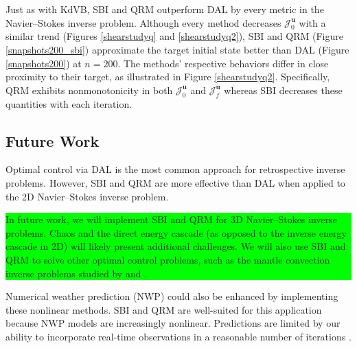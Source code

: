 \documentclass[%
 reprint,
 amsmath,amssymb,
 aps,
 pre,
]{revtex4-2}
\newcommand{\hly}[1]{\colorbox{lime}{\parbox{\columnwidth}{#1}}}
\renewcommand{\vec}[1]{\boldsymbol{#1}}
\newcommand{\Juf}{\mathcal{J}^{u}_f}
\newcommand{\JUo}{\mathcal{J}^{\vec{u}}_0}
\newcommand{\JUf}{\mathcal{J}^{\vec{u}}_f}
\begin{document}
Just as with KdVB, SBI and QRM outperform DAL by every metric in the Navier--Stokes inverse problem.
Although every method decreases $\JUo$ with a similar trend (Figures \ref{shearstudyq} and \ref{shearstudyq2}), SBI and QRM (Figure \ref{snapshots200_sbi}) approximate the target initial state better than DAL (Figure \ref{snapshots200}) at $n=200$.
The methods' respective behaviors differ in close proximity to their target, as illustrated in Figure \ref{shearstudyq2}.
Specifically, QRM exhibits nonmonotonicity in both $\JUo$ and $\JUf$ whereas SBI decreases these quantities with each iteration.



\subsection{Future Work}
\label{secConfuture}
Optimal control via DAL is the most common approach for retrospective inverse problems.
However, SBI and QRM are more effective than DAL when applied to the 2D Navier--Stokes inverse problem.
\hly{In future work, we will implement SBI and QRM for 3D Navier--Stokes inverse problems.
Chaos and the direct energy cascade (as opposed to the inverse energy cascade in 2D) will likely present additional challenges.
We will also use SBI and QRM to solve other optimal control problems, such as the mantle convection inverse problems studied by \cite{Liu2008} and \cite{Li2017}.}
Numerical weather prediction (NWP) could also be enhanced by implementing these nonlinear methods.
SBI and QRM are well-suited for this application because NWP models are increasingly nonlinear.
Predictions are limited by our ability to incorporate real-time observations in a reasonable number of iterations \cite{Bonavita2018}.
\end{document}
